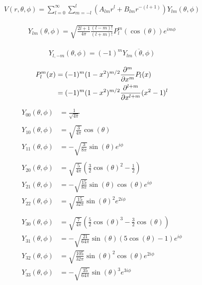 \begin{align*}
	V(r,\theta,\phi) = \sum_{l=0}^{\infty} \sum_{m=-l}^l%
		(A_{lm} r^l + B_{lm} r^{-(l+1)})Y_{lm}(\theta,\phi)
\end{align*}

\begin{align*}
	Y_{lm}(\theta, \phi) = \sqrt{\frac{2l+1}{4\pi} \frac{(l-m)!}{(l+m)!}} P_l^m(\cos(\theta)) e^{im\phi}
\end{align*}

\begin{align*}
	Y_{l,-m}(\theta, \phi) = (-1)^m \overline{Y_{lm}(\theta, \phi)}
\end{align*}

\begin{align*}
	P_l^m(x) &= (-1)^m (1-x^2)^{m/2} \frac{\partial^m}{\partial x^m} P_l(x) \\
			 &= (-1)^m (1-x^2)^{m/2} \frac{\partial^{l+m}}{\partial x^{l+m}} (x^2-1)^l
\end{align*}

\begin{align*}
	Y_{00}(\theta, \phi) &=%
		\frac{1}{\sqrt{4\pi}} \\
	\\
	Y_{10}(\theta, \phi) &=%
		\sqrt{\frac{3}{4\pi}} \cos(\theta) \\
	Y_{11}(\theta, \phi) &=%
		-\sqrt{\frac{3}{8\pi}} \sin(\theta) e^{i\phi} \\
	\\
	Y_{20}(\theta, \phi) &=%
		\sqrt{\frac{5}{4\pi}} (\tfrac{3}{2}\cos(\theta)^2-\tfrac{1}{2}) \\
	Y_{21}(\theta, \phi) &=%
		-\sqrt{\frac{15}{8\pi}} \sin(\theta) \cos(\theta) e^{i\phi} \\
	Y_{22}(\theta, \phi) &=%
		\sqrt{\frac{15}{32\pi}} \sin(\theta)^2 e^{2i\phi} \\
	\\
	Y_{30}(\theta, \phi) &=%
		\sqrt{\frac{7}{4\pi}} (\tfrac{5}{2}\cos(\theta)^3-\tfrac{3}{2}\cos(\theta)) \\
	Y_{31}(\theta, \phi) &=%
		-\sqrt{\frac{21}{64\pi}} \sin(\theta) (5\cos(\theta)-1) e^{i\phi} \\
	Y_{32}(\theta, \phi) &=%
		\sqrt{\frac{105}{32\pi}} \sin(\theta)^2 \cos(\theta) e^{2i\phi} \\
	Y_{33}(\theta, \phi) &=%
		-\sqrt{\frac{35}{64\pi}} \sin(\theta)^3 e^{3i\phi} \\
\end{align*}
